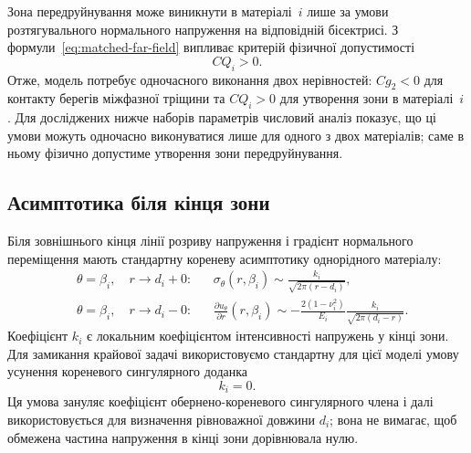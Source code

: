 Зона передруйнування може виникнути в матеріалі~$i$ лише за умови
розтягувального нормального напруження на відповідній бісектрисі. З
формули~\eqref{eq:matched-far-field} випливає критерій фізичної допустимості
\begin{equation*}
  CQ_i>0.
\end{equation*}
Отже, модель потребує одночасного виконання двох нерівностей:
$Cg_2<0$ для контакту берегів міжфазної тріщини та $CQ_i>0$ для
утворення зони в матеріалі~$i$. Для досліджених нижче наборів параметрів
числовий аналіз показує, що ці умови можуть одночасно виконуватися лише
для одного з двох матеріалів; саме в ньому фізично допустиме утворення
зони передруйнування.

\subsection{Асимптотика біля кінця зони}
\label{subsec:zone-tip-asymptotics}

Біля зовнішнього кінця лінії розриву напруження і градієнт нормального
переміщення мають стандартну кореневу асимптотику однорідного матеріалу:
\begin{equation}
\label{eq:zone-tip-asymptotics}
\begin{aligned}
  &\theta=\beta_i,\quad r\to d_i+0:
  &&\sigma_\theta(r,\beta_i)
    \sim \frac{k_i}{\sqrt{2\pi(r-d_i)}},\\[3pt]
  &\theta=\beta_i,\quad r\to d_i-0:
  &&\frac{\partial u_\theta}{\partial r}(r,\beta_i)
    \sim -\frac{2(1-\nu_i^2)}{E_i}
    \frac{k_i}{\sqrt{2\pi(d_i-r)}}.
\end{aligned}
\end{equation}
Коефіцієнт $k_i$ є локальним коефіцієнтом інтенсивності напружень у
кінці зони. Для замикання крайової задачі використовуємо стандартну для
цієї моделі умову усунення кореневого сингулярного доданка
\cite{KaminskyDudykPolishchuk2024}
\begin{equation*}
  k_i=0.
\end{equation*}
Ця умова зануляє коефіцієнт обернено-кореневого сингулярного члена і
далі використовується для визначення рівноважної довжини $d_i$; вона не
вимагає, щоб обмежена частина напруження в кінці зони дорівнювала нулю.
